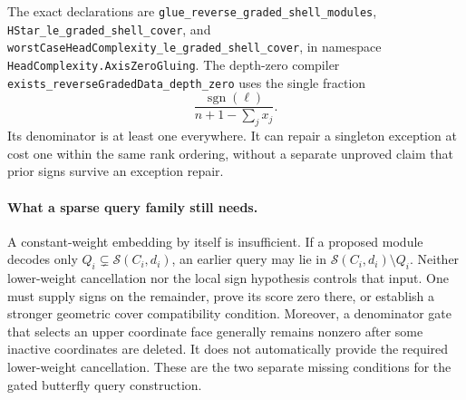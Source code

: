 \documentclass[11pt]{article}
\begin{document}
The exact declarations are
\texttt{glue\_reverse\_graded\_shell\_modules},
\texttt{HStar\_le\_graded\_shell\_cover}, and
\texttt{worstCaseHeadComplexity\_le\_graded\_shell\_cover}, in namespace
\texttt{HeadComplexity.AxisZeroGluing}. The depth-zero compiler
\texttt{exists\_reverseGradedData\_depth\_zero} uses the single fraction
\[
 \frac{\operatorname{sgn}(\ell)}{n+1-\sum_jx_j}.
\]
Its denominator is at least one everywhere. It can repair a singleton
exception at cost one within the same rank ordering, without a separate
unproved claim that prior signs survive an exception repair.

\paragraph{What a sparse query family still needs.}
A constant-weight embedding by itself is insufficient. If a proposed
module decodes only $Q_i\subsetneq\mathcal S(C_i,d_i)$, an earlier query
may lie in $\mathcal S(C_i,d_i)\setminus Q_i$. Neither lower-weight
cancellation nor the local sign hypothesis controls that input. One must
supply signs on the remainder, prove its score zero there, or establish a
stronger geometric cover compatibility condition. Moreover, a denominator
gate that selects an upper coordinate face generally remains nonzero after
some inactive coordinates are deleted. It does not automatically provide
the required lower-weight cancellation. These are the two separate missing
conditions for the gated butterfly query construction.
\end{document}

